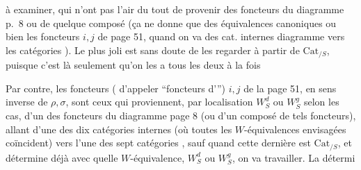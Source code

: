 à examiner, qui n'ont pas l'air du tout de provenir des foncteurs du diagramme p.~8 ou de quelque composé (ça ne donne que des équivalences canoniques ou bien les foncteurs $i,j$ de page 51\unsure{)|,}, quand on va des cat. internes  diagramme vers les catégories ). Le plus joli est sans doute de les regarder à partir de $\mathrm{Cat}_{/S}$, puisque c'est là seulement qu'on les a tous les deux à la fois

Par contre, les foncteurs ( d'appeler ``foncteurs d''') $i,j$ de la page 51, en sens inverse de $\rho,\sigma$, sont ceux qui proviennent, par localisation $W_S^d$ ou $W_S^g$ selon les cas, d'un des foncteurs du diagramme page 8 (ou d'un composé de tels foncteurs), allant d'une des dix catégories internes (où toutes les $W$-équivalences envisagées coïncident) vers l'une des sept catégories , sauf quand cette dernière est $\mathrm{Cat}_{/S}$, et détermine déjà avec quelle $W$-équivalence, $W_S^d$ ou $W_S^g$, on va travailler. La détermi%

